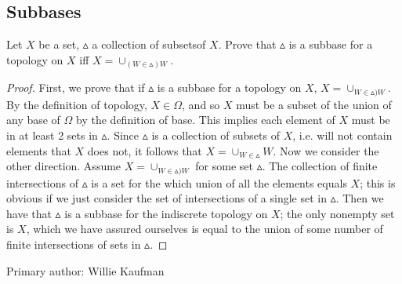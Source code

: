 \subsection{Subbases}
\begin{minorEx}%
Let $X$ be a set, $\vartriangle$ a collection of subsetsof $X$. Prove that $\vartriangle$ is a subbase for a topology on $X$ iff $X = \cup_{(W \in \vartriangle) W}$.
\end{minorEx}
\begin{proof}
First, we prove that if $\vartriangle$ is a subbase for a topology on $X$, $X = \cup_{W \in \vartriangle) W}$. By the definition of topology, $X \in \Omega$, and so $X$ must be a subset of the union of any base of $\Omega$ by the definition of base. This implies each element of $X$ must be in at least 2 sets in $\vartriangle$. Since $\vartriangle$ is a collection of subsets of $X$, i.e. will not contain elements that $X$ does not, it follows that $X = \cup_{W \in \vartriangle} W$.
Now we consider the other direction. Assume $X = \cup_{W \in \vartriangle) W}$ for some set $\vartriangle$. The collection of finite intersections of $\vartriangle$ is a set for the which union of all the elements equals $X$; this is obvious if we just consider the set of intersections of a single set in $\vartriangle$. Then we have that $\vartriangle$ is a subbase for the indiscrete topology on $X$; the only nonempty set is $X$, which we have assured ourselves is equal to the union of some number of finite intersections of sets in $\vartriangle$.
\end{proof}

Primary author: Willie Kaufman
